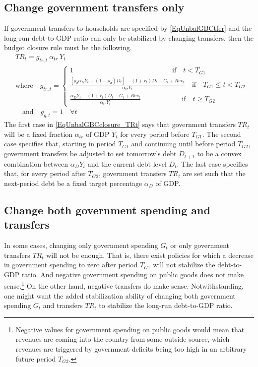   \subsection{Change government transfers only}\label{SecUnbalGBC_chgTRt}

    If government transfers to households are specified by \eqref{EqUnbalGBCtfer} and the long-run debt-to-GDP ratio can only be stabilized by changing transfers, then the budget closure rule must be the following.
    \begin{equation}\label{EqUnbalGBCclosure_TRt}
      \begin{split}
        &TR_t = g_{tr,t}\:\alpha_{tr}\: Y_t \\
        &\text{where}\quad g_{tr,t} =
          \begin{cases}
            1 \qquad\qquad\qquad\qquad\qquad\qquad\qquad\:\text{if}\quad t < T_{G1} \\
            \frac{\left[\rho_{d}\alpha_{D}Y_{t} + (1-\rho_{d})D_{t}\right] - (1+r_{t})D_{t} - G_{t} + Rev_{t}}{\alpha_{tr} Y_t} \quad\text{if}\quad T_{G1}\leq t<T_{G2} \\
            \frac{\alpha_{D}Y_{t} - (1+r_{t})D_{t} - G_{t} + Rev_{t}}{\alpha_{tr} Y_t} \qquad\qquad\quad\:\:\:\:\text{if}\quad t \geq T_{G2}
          \end{cases} \\
        &\quad\text{and}\quad g_{g,t} = 1 \quad\forall t
      \end{split}
    \end{equation}
    The first case in \eqref{EqUnbalGBCclosure_TRt} says that government transfers $TR_t$ will be a fixed fraction $\alpha_{tr}$ of GDP $Y_t$ for every period before $T_{G1}$. The second case specifies that, starting in period $T_{G1}$ and continuing until before period $T_{G2}$, government transfers be adjusted to set tomorrow's debt $D_{t+1}$ to be a convex combination between $\alpha_D Y_t$ and the current debt level $D_t$. The last case specifies that, for every period after $T_{G2}$, government transfers $TR_t$ are set such that the next-period debt be a fixed target percentage $\alpha_D$ of GDP.


  \subsection{Change both government spending and transfers}\label{SecUnbalGBC_chgGtTRt}

    In some cases, changing only government spending $G_t$ or only government transfers $TR_t$ will not be enough. That is, there exist policies for which a decrease in government spending to zero after period $T_{G1}$ will not stabilize the debt-to-GDP ratio. And negative government spending on public goods does not make sense.\footnote{Negative values for government spending on public goods would mean that revenues are coming into the country from some outside source, which revenues are triggered by government deficits being too high in an arbitrary future period $T_{G2}$.} On the other hand, negative transfers do make sense. Notwithstanding, one might want the added stabilization ability of changing both government spending $G_t$ and transfers $TR_t$ to stabilize the long-run debt-to-GDP ratio.

